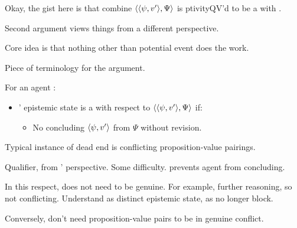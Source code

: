 \begin{note}
  \color{red}
  Okay, the gist here is that combine \(\langle \langle \psi, v' \rangle, \Psi \rangle\) is ptivityQV'd to be a \fc{} with \deadEnd{}.
\end{note}

\begin{note}
  Second argument views things from a different perspective.

  Core idea is that nothing other than potential event does the work.
\end{note}

\begin{note}[A \deadEnd{}]
  Piece of terminology for the argument.

  \begin{definition}[A \deadEnd{0}]
    \label{def:dead-end}
    For an agent \vAgent{}:

    \begin{itemize}
    \item
      \vAgent{}' epistemic state is a \emph{} with respect to \(\langle \langle \psi, v' \rangle, \Psi \rangle\) if:
      \begin{itemize}
      \item
        No concluding \(\langle \psi, v' \rangle\) from \(\Psi\) without revision.
      \end{itemize}
    \end{itemize}
    \vspace{-\baselineskip}
  \end{definition}

  Typical instance of dead end is conflicting proposition-value pairings.

  Qualifier, from \vAgent{}' perspective.
  Some difficulty.
  \deadEnd{} prevents agent from concluding.

  In this respect, \deadEnd{} does not need to be genuine.
  For example, further reasoning, so not conflicting.
  Understand as distinct epistemic state, as no longer block.

  Conversely, don't need proposition-value pairs to be in genuine conflict.
\end{note}


